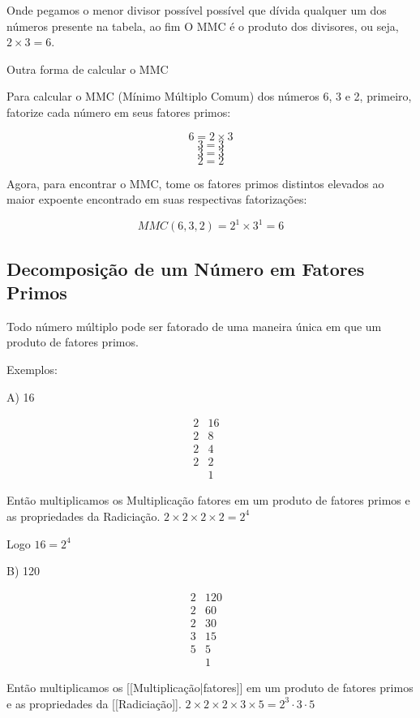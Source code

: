 \documentclass[letterpaper]{book}
\begin{document}
Onde pegamos o menor divisor possível possível que dívida qualquer um dos números presente na tabela, ao fim O MMC é o produto dos divisores, ou seja, \(2 \times 3 = 6\).

Outra forma de calcular o MMC 

Para calcular o MMC (Mínimo Múltiplo Comum) dos números 6, 3 e 2, primeiro, fatorize cada número em seus fatores primos:

\[6 = 2 \times 3\]
\[3 = 3\]
\[3 = 3\]
\[2 = 2\]

Agora, para encontrar o MMC, tome os fatores primos distintos elevados ao maior expoente encontrado em suas respectivas fatorizações:

\[MMC(6,3,2)=2^{1} \times 3^{1}= 6\]


\subsection{Decomposição de um Número em Fatores Primos}

Todo número múltiplo pode ser fatorado de uma maneira única em que um produto de fatores primos.

Exemplos:

A) 16

\[
\begin{array}{c|ccc}
2 & 16 &\\
\hline 
2  & 8 \\
2 & 4 \\
2 & 2 \\
& 1
\end{array}
\]

Então multiplicamos os Multiplicação fatores em um produto de fatores primos e as propriedades da Radiciação. \(2\times 2 \times 2 \times 2 = 2^{4}\)

Logo \(16 = 2^{4}\)

B) 120

\[
\begin{array}{c|cc}
2 & 120 & \\
\hline
2 & 60 \\
2 & 30 \\
3 & 15 \\
5 & 5 \\
  & 1
\end{array}
\]

Então multiplicamos os [[Multiplicação|fatores]] em um produto de fatores primos e as propriedades da [[Radiciação]]. \(2\times 2 \times 2 \times 3 \times 5 = 2^{3} \cdot 3 \cdot 5\)
\end{document}
